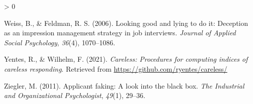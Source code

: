 \documentclass[
  english,
  ,jou]{apa6}
\newlength{\cslhangindent}
\newenvironment{CSLReferences}[2] %
 {%
  \setlength{\parindent}{0pt}
  \ifodd #1 \everypar{\setlength{\hangindent}{\cslhangindent}}\ignorespaces\fi
  \ifnum #2 > 0
  \setlength{\parskip}{#2\baselineskip}
  \fi
 }%
 {}
\begin{document}
\begin{CSLReferences}{1}{0}
\leavevmode\hypertarget{ref-weiss_looking_2006}{}%
Weiss, B., \& Feldman, R. S. (2006). Looking good and lying to do it: Deception as an impression management strategy in job interviews. \emph{Journal of Applied Social Psychology}, \emph{36}(4), 1070--1086.

\leavevmode\hypertarget{ref-R-careless}{}%
Yentes, R., \& Wilhelm, F. (2021). \emph{Careless: Procedures for computing indices of careless responding}. Retrieved from \url{https://github.com/ryentes/careless/}

\leavevmode\hypertarget{ref-ziegler_applicant_2011}{}%
Ziegler, M. (2011). Applicant faking: A look into the black box. \emph{The Industrial and Organizational Psychologist}, \emph{49}(1), 29--36.

\end{CSLReferences}

\endgroup
\end{document}
